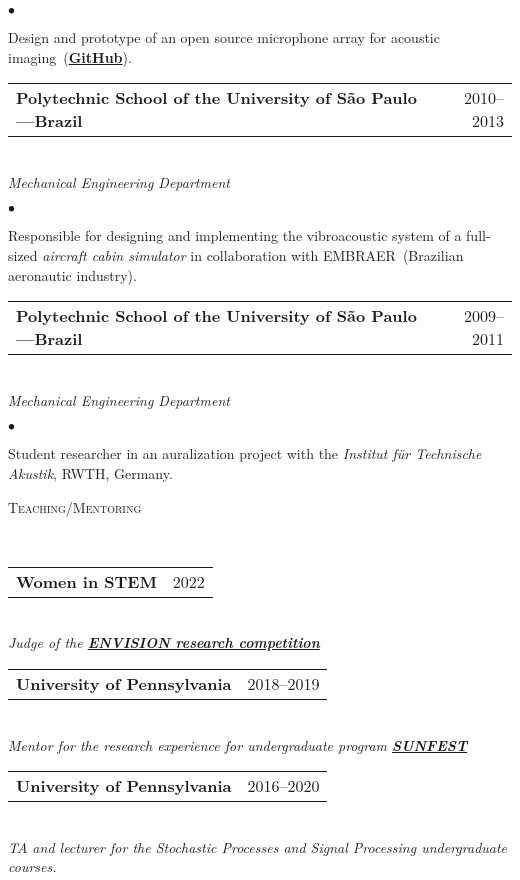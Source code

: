 \documentclass[a4paper,11pt]{article}
\makeatletter
\newcommand{\CVheading}[1]{
	\vspace{10pt}
	{ \large
	\begin{minipage}{\textwidth}
		\textsc{#1 \vphantom{p\^{E}}}
	\end{minipage} } \\
	\vspace{5pt}
}
\newcommand{\CVsubheading}[2]{
	\begin{tabular*}{\textwidth}{l@{\extracolsep{\fill}}r}
		\textbf{#1} & #2 \\
	\end{tabular*} \\
}
\newcommand{\CVlist}{
	\begin{list}{$\bullet$}{
	\setlength{\itemsep}{0pt}
	\setlength{\parsep}{1pt}
	\setlength{\topsep}{1pt}
	\setlength{\partopsep}{0pt}
	\setlength{\leftmargin}{24pt}
	\setlength{\labelwidth}{1em} }
}
\newcommand{\CVlistend}{
	\end{list}
	\vspace{3pt}
}
\makeatother
\begin{document}
	\CVlist

	\item
	Design and prototype of an open source microphone array for acoustic imaging~(\href{https://github.com/lfochamon/memsarray}{\textbf{GitHub}}).

	\CVlistend



\CVsubheading{Polytechnic School of the University of São Paulo---Brazil}{2010--2013}
\textit{Mechanical Engineering Department}

	\CVlist

	\item
	Responsible for designing and implementing the vibroacoustic system of a full-sized
	\textit{aircraft cabin simulator} in collaboration with EMBRAER~(Brazilian aeronautic industry).


	\CVlistend



\CVsubheading{%
Polytechnic School of the University of São Paulo---Brazil%
}{2009--2011}
\textit{Mechanical Engineering Department}

	\CVlist

	\item
	Student researcher in an auralization project with the \textit{Institut für Technische Akustik}, RWTH, Germany.

	\CVlistend



\CVheading{Teaching/Mentoring}


\CVsubheading{Women in STEM}{2022}
\textit{Judge of the \href{http://envisionrc.com/}{\textbf{\emph{ENVISION research competition}}}}
\vspace{3pt}

\CVsubheading{University of Pennsylvania}{2018--2019}
\textit{Mentor for the research experience for undergraduate program \href{https://sunfest.seas.upenn.edu}{\textbf{\emph{SUNFEST}}}}
\vspace{3pt}


\CVsubheading{University of Pennsylvania}{2016--2020}
\textit{TA and lecturer for the Stochastic Processes and Signal Processing undergraduate courses.}
\vspace{3pt}
\end{document}
